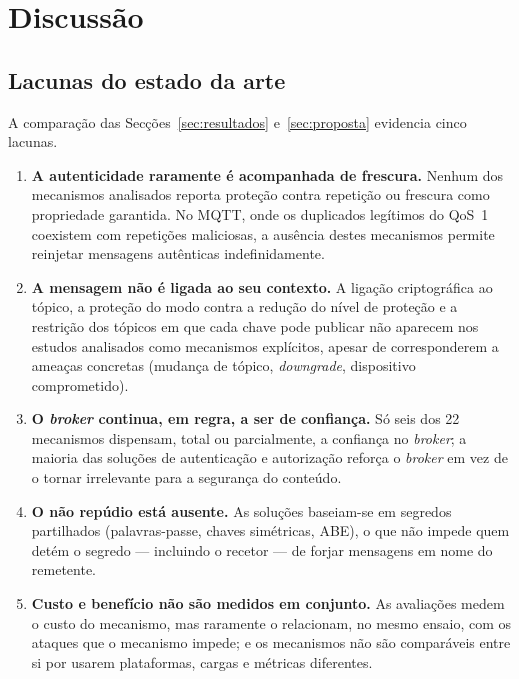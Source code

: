 \section{Discussão}
\label{sec:discussao}

\subsection{Lacunas do estado da arte}

A comparação das Secções~\ref{sec:resultados} e~\ref{sec:proposta} evidencia cinco
lacunas.

\begin{enumerate}[label=\textbf{L\arabic*.}, leftmargin=*]
  \item \textbf{A autenticidade raramente é acompanhada de frescura.} Nenhum dos
    mecanismos analisados reporta proteção contra repetição ou frescura como
    propriedade garantida. No MQTT, onde os duplicados legítimos do QoS~1 coexistem
    com repetições maliciosas, a ausência destes mecanismos permite reinjetar
    mensagens autênticas indefinidamente.
  \item \textbf{A mensagem não é ligada ao seu contexto.} A ligação criptográfica ao
    tópico, a proteção do modo contra a redução do nível de proteção e a restrição
    dos tópicos em que cada chave pode publicar não aparecem nos estudos
    analisados como mecanismos explícitos, apesar de corresponderem a ameaças
    concretas (mudança de tópico, \emph{downgrade}, dispositivo comprometido).
  \item \textbf{O \emph{broker} continua, em regra, a ser de confiança.} Só seis dos
    22 mecanismos dispensam, total ou parcialmente, a confiança no \emph{broker}; a
    maioria das soluções de autenticação e autorização reforça o \emph{broker} em
    vez de o tornar irrelevante para a segurança do conteúdo.
  \item \textbf{O não repúdio está ausente.} As soluções baseiam-se em segredos
    partilhados (palavras-passe, chaves simétricas, ABE), o que não impede quem
    detém o segredo --- incluindo o recetor --- de forjar mensagens em nome do
    remetente.
  \item \textbf{Custo e benefício não são medidos em conjunto.} As avaliações
    medem o custo do mecanismo, mas raramente o relacionam, no mesmo ensaio, com os
    ataques que o mecanismo impede; e os mecanismos não são comparáveis entre si
    por usarem plataformas, cargas e métricas diferentes.
\end{enumerate}

